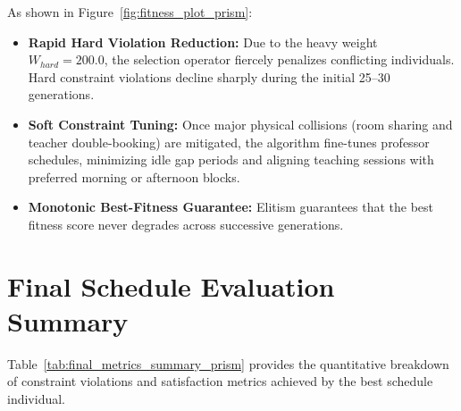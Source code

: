 \documentclass[12pt,a4paper]{report}
\begin{document}
As shown in Figure~\ref{fig:fitness_plot_prism}:
\begin{itemize}[leftmargin=1.5em]
  \item \textbf{Rapid Hard Violation Reduction:} Due to the heavy weight $W_{hard} = 200.0$, the selection operator fiercely penalizes conflicting individuals. Hard constraint violations decline sharply during the initial 25--30 generations.
  \item \textbf{Soft Constraint Tuning:} Once major physical collisions (room sharing and teacher double-booking) are mitigated, the algorithm fine-tunes professor schedules, minimizing idle gap periods and aligning teaching sessions with preferred morning or afternoon blocks.
  \item \textbf{Monotonic Best-Fitness Guarantee:} Elitism guarantees that the best fitness score never degrades across successive generations.
\end{itemize}

\section{Final Schedule Evaluation Summary}
Table~\ref{tab:final_metrics_summary_prism} provides the quantitative breakdown of constraint violations and satisfaction metrics achieved by the best schedule individual.
\end{document}
